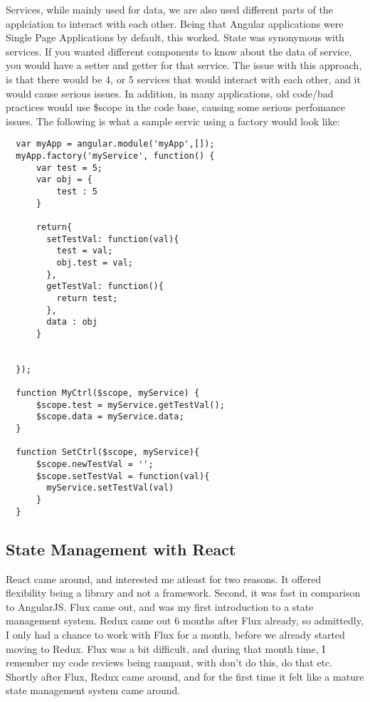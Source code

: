 Services, while mainly used for data, we are also used different parts of the
applciation to interact with each other. Being that Angular applications were
Single Page Applications by default, this worked. State was synonymous with
services. If you wanted different components to know about the data of service,
you would have a setter and getter for that service. The issue with this
approach, is that there would be 4, or 5 services that would interact with each
other, and it would cause serious issues. In addition, in many applications, old
code/bad practices would use \$scope in the code base, causing some serious
perfomance issues. The following is what a sample servic using a factory would
look like:

\begin{lstlisting}
  var myApp = angular.module('myApp',[]);
  myApp.factory('myService', function() {
      var test = 5;
      var obj = {
          test : 5
      }

      return{
        setTestVal: function(val){
          test = val;
          obj.test = val;
        },
        getTestVal: function(){
          return test;
        },
        data : obj
      }


  });

  function MyCtrl($scope, myService) {
      $scope.test = myService.getTestVal();
      $scope.data = myService.data;
  }

  function SetCtrl($scope, myService){
      $scope.newTestVal = '';
      $scope.setTestVal = function(val){
        myService.setTestVal(val)
      }
  }
\end{lstlisting}


\subsection{ State Management with React }
React came around, and interested me atleast for two reasons. It offered
flexibility being a library and not a framework. Second, it was fast in
comparison to AngularJS. Flux came out, and was my first introduction to a
state management system. Redux came out 6 months after Flux already, so
admittedly, I only had a chance to work with Flux for a month, before we already
started moving to Redux. Flux was a bit difficult, and during that month time,
I remember my code reviews being rampant, with don't do this, do that etc.
Shortly after Flux, Redux came around, and for the first time it felt like a
mature state management system came around.


